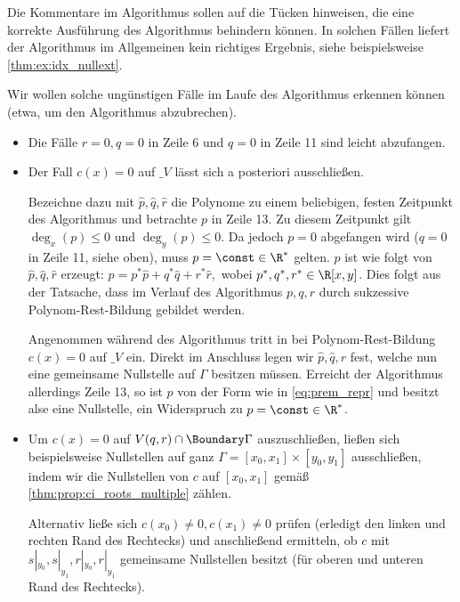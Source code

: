 \documentclass{mythesis}
\begin{document}
\begin{remark} \label{thm:rem:idx_badcases}
    Die Kommentare im Algorithmus sollen auf die Tücken hinweisen, die eine korrekte Ausführung des Algorithmus behindern können.
    In solchen Fällen liefert der Algorithmus im Allgemeinen kein richtiges Ergebnis, siehe beispielsweise \ref{thm:ex:idx_nullext}.

    Wir wollen solche ungünstigen Fälle im Laufe des Algorithmus erkennen können (etwa, um den Algorithmus abzubrechen).

    \begin{itemize}
        \item
            Die Fälle $r = 0, q = 0$ in Zeile 6 und $q = 0$ in Zeile 11 sind leicht abzufangen.
        \item
            Der Fall $c(x) = 0$ auf $\_V$ lässt sich a posteriori ausschließen.

            Bezeichne dazu mit $\hat p, \hat q, \hat r$ die Polynome zu einem beliebigen, festen Zeitpunkt des Algorithmus und betrachte $p$ in Zeile 13.
            Zu diesem Zeitpunkt gilt $\deg_x(p) \le 0$ und $\deg_y(p) \le 0$.
            Da jedoch $p = 0$ abgefangen wird ($q = 0$ in Zeile 11, siehe oben), muss $p = \const \in \R^*$ gelten.
            $p$ ist wie folgt von $\hat p, \hat q, \hat r$ erzeugt:
            \begin{math}[numbered] \label{eq:prem_repr}
                p = p^* \hat p + q^* \hat q + r^* \hat r,
            \end{math}
            wobei $p^*, q^*, r^* \in \R[x,y]$.
            Dies folgt aus der Tatsache, dass im Verlauf des Algorithmus $p, q, r$ durch sukzessive Polynom-Rest-Bildung gebildet werden.

            Angenommen während des Algorithmus tritt in bei Polynom-Rest-Bildung $c(x) = 0$ auf $\_V$ ein.
            Direkt im Anschluss legen wir $\hat p, \hat q, \hat r$ fest, welche nun eine gemeinsame Nullstelle auf $\Gamma$ besitzen müssen.
            Erreicht der Algorithmus allerdings Zeile 13, so ist $p$ von der Form wie in \ref{eq:prem_repr} und besitzt alse eine Nullstelle, ein Widerspruch zu $p = \const \in \R^*$.
        \item
            Um $c(x) = 0$ auf $V(q,r) \cap \Boundary\Gamma$ auszuschließen, ließen sich beispielsweise Nullstellen auf ganz $\Gamma = [x_0, x_1] \times [y_0, y_1]$ ausschließen, indem wir die Nullstellen von $c$ auf $[x_0, x_1]$ gemäß \ref{thm:prop:ci_roots_multiple} zählen.

            Alternativ ließe sich $c(x_0) \neq 0, c(x_1) \neq 0$ prüfen (erledigt den linken und rechten Rand des Rechtecks) und anschließend ermitteln, ob $c$ mit $s|_{y_0}, s|_{y_1}, r|_{y_0}, r|_{y_1}$ gemeinsame Nullstellen besitzt (für oberen und unteren Rand des Rechtecks).
    \end{itemize}
\end{remark}
\end{document}
